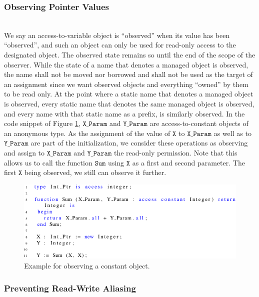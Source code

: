 \documentclass{llncs}
\newcommand\var[1]{\ensuremath{\mathtt{#1}}}
\begin{document}
\subsubsection{Observing Pointer Values}
\label{sec:observing}
\ \\

We say an access-to-variable object is ``observed'' when its value has been ``observed'', and such an object can only be used for read-only access to the designated object.
The observed state remains so until the end of the scope of the observer. While the state of a name that denotes a managed object is observed, the name shall not be moved nor
borrowed and shall not be used as the target of an assignment since we want observed objects and everything ``owned'' by them to be read only. At the point where a static name
that denotes a managed object is observed, every static name that denotes the same managed object is observed, and every name with that static name as a prefix, is similarly observed. 
In the code snippet of Figure \ref{fig:observe_exp}, \var{X\_Param} and \var{Y\_Param} are access-to-constant objects of an anonymous type. As the assignment of the value of \var{X} to \var{X\_Param}
as well as to \var{Y\_Param} are part of the initialization, we consider these operations as observing and assign to \var{X\_Param} and \var{Y\_Param} the read-only permission. Note that
this allows us to call the function \var{Sum} using \var{X} as a first and second parameter. The first \var{X} being observed, we still can observe it further. 

\begin{figure}[htb!]
\centering
   \includegraphics[]{observe_ex1}
   \caption{Example for observing a constant object.}
   \label{fig:observe_exp}
\end{figure}

\subsubsection{Preventing Read-Write Aliasing}
\label{sec:noaliasing}
\ \\
\end{document}
